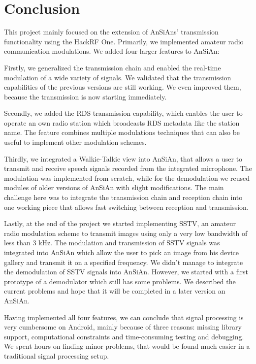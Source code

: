 \chapter{Conclusion}
This project mainly focused on the extension of \ac{AnSiAn}s' transmission functionality using the HackRF One. Primarily, we implemented amateur radio communication modulations. We added four larger features to \ac{AnSiAn}: 

Firstly, we generalized the transmission chain and enabled the real-time modulation of a wide variety of signals. We validated that the transmission capabilities of the previous versions are still working. We even improved them, because the transmission is now starting immediately. 

Secondly, we added the \ac{RDS} transmission capability, which enables the user to operate an own radio station which broadcasts \ac{RDS} metadata like the station name. The feature combines multiple modulations techniques that can also be useful to implement other modulation schemes. 

Thirdly, we integrated a Walkie-Talkie view into \ac{AnSiAn}, that allows a user to transmit and receive speech signals recorded from the integrated microphone. The modulation was implemented from scratch, while for the demodulation we reused modules of older versions of \ac{AnSiAn} with slight modifications. The main challenge here was to integrate the transmission chain and reception chain into one working piece that allows fast switching between reception and transmission. 

Lastly, at the end of the project we started implementing \ac{SSTV}, an amateur radio modulation scheme to transmit images using only a very low bandwidth of less than 3 kHz. The modulation and transmission of \ac{SSTV} signals was integrated into \ac{AnSiAn} which allow the user to pick an image from his device gallery and transmit it on a specified frequency. We didn't manage to integrate the demodulation of \ac{SSTV} signals into AnSiAn. However, we started with a first prototype of a demodulator which still has some problems. We described the current problems and hope that it will be completed in a later version an \ac{AnSiAn}.

Having implemented all four features, we can conclude that signal processing is very cumbersome on Android, mainly because of three reasons: missing library support, computational constraints and time-consuming testing and debugging. We spent hours on finding minor problems, that would be found much easier in a traditional signal processing setup.

